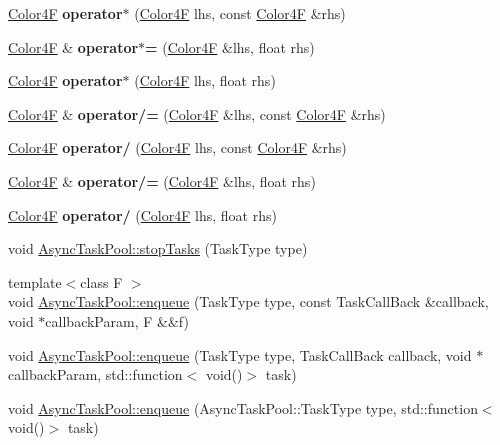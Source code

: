 \begin{DoxyCompactItemize}
\hyperlink{structColor4F}{Color4F} {\bfseries operator$\ast$} (\hyperlink{structColor4F}{Color4F} lhs, const \hyperlink{structColor4F}{Color4F} \&rhs)
\item 
\mbox{\label{group__base_ga6ac02999f598c0ec095c6f4d8dc74df0}} 
\hyperlink{structColor4F}{Color4F} \& {\bfseries operator$\ast$=} (\hyperlink{structColor4F}{Color4F} \&lhs, float rhs)
\item 
\mbox{\label{group__base_gadb36fd54990722534cf01409bfa2004d}} 
\hyperlink{structColor4F}{Color4F} {\bfseries operator$\ast$} (\hyperlink{structColor4F}{Color4F} lhs, float rhs)
\item 
\mbox{\label{group__base_gaa69174ddcc985aa55a1d301291cd243a}} 
\hyperlink{structColor4F}{Color4F} \& {\bfseries operator/=} (\hyperlink{structColor4F}{Color4F} \&lhs, const \hyperlink{structColor4F}{Color4F} \&rhs)
\item 
\mbox{\label{group__base_ga47397cb37fd8889002807e3ad882b16c}} 
\hyperlink{structColor4F}{Color4F} {\bfseries operator/} (\hyperlink{structColor4F}{Color4F} lhs, const \hyperlink{structColor4F}{Color4F} \&rhs)
\item 
\mbox{\label{group__base_ga65d54793cef9f47988c40485330b6e8c}} 
\hyperlink{structColor4F}{Color4F} \& {\bfseries operator/=} (\hyperlink{structColor4F}{Color4F} \&lhs, float rhs)
\item 
\mbox{\label{group__base_ga93a286be3457421cea0f70d90505ab04}} 
\hyperlink{structColor4F}{Color4F} {\bfseries operator/} (\hyperlink{structColor4F}{Color4F} lhs, float rhs)
\item 
void \hyperlink{group__base_gacb1c072daf35d81ddc62e1f40b61da29}{Async\+Task\+Pool\+::stop\+Tasks} (Task\+Type type)
\item 
{\footnotesize template$<$class F $>$ }\\void \hyperlink{group__base_ga0e3628387bd146dc14d59271760a6fe2}{Async\+Task\+Pool\+::enqueue} (Task\+Type type, const Task\+Call\+Back \&callback, void $\ast$callback\+Param, F \&\&f)
\item 
void \hyperlink{group__base_gafba78936b0f70e83213652ec4c0c491c}{Async\+Task\+Pool\+::enqueue} (Task\+Type type, Task\+Call\+Back callback, void $\ast$callback\+Param, std\+::function$<$ void()$>$ task)
\item 
void \hyperlink{group__base_ga6034f6bbde8bda7d6763520a8732618c}{Async\+Task\+Pool\+::enqueue} (Async\+Task\+Pool\+::\+Task\+Type type, std\+::function$<$ void()$>$ task)
\end{DoxyCompactItemize}

